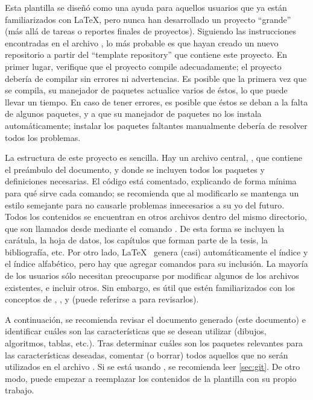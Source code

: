 Esta plantilla se dise\~n\'o como una ayuda para aquellos usuarios que ya
est\'an familiarizados con \LaTeX, pero nunca han desarrollado un proyecto
``grande'' (m\'as all\'a de tareas o reportes finales de proyectos).   Siguiendo
las instrucciones encontradas en el archivo , lo m\'as probable
es que hayan creado un nuevo repositorio a partir del ``template repository''
que contiene este proyecto.   En primer lugar, verifique que el proyecto compile
adecuadamente; el proyecto deber\'ia de compilar sin errores ni advertencias. Es
posible que la primera vez que se compila, su manejador de paquetes actualice
varios de \'estos, lo que puede llevar un tiempo.   En caso de tener errores, es
posible que \'estos se deban a la falta de algunos paquetes, y a que su
manejador de paquetes no los instala autom\'aticamente;  instalar los paquetes
faltantes manualmente deber\'ia de resolver todos los problemas.

La estructura de este proyecto es sencilla.   Hay un archivo central,
, que contiene el pre\'ambulo del documento, y donde se incluyen
todos los paquetes y definiciones necesarias.   El c\'odigo est\'a comentado,
explicando de forma m\'inima para qu\'e sirve cada comando; se recomienda que al
modificarlo se mantenga un estilo semejante para no causarle problemas
innecesarios a su yo del futuro.   Todos los contenidos se encuentran en otros
archivos dentro del mismo directorio, que son llamados desde 
mediante el comando .   De esta forma se
incluyen la car\'atula, la hoja de datos, los cap\'itulos que forman parte de la
tesis, la bibliograf\'ia, etc.   Por otro lado, \LaTeX~ genera (casi)
autom\'aticamente el \'indice y el \'indice alfab\'etico, pero hay que agregar
comandos para su inclusi\'on.  La mayor\'ia de los usuarios s\'olo necesitan
preocuparse por modificar algunos de los archivos existentes, e incluir otros.
Sin embargo, es \'util que est\'en familiarizados con los conceptos de
, ,  y  (puede
referirse a \cite{oetiker2007} para revisarlos).

A continuaci\'on, se recomienda revisar el documento generado (este documento) e
identificar cu\'ales son las caracter\'isticas que se desean utilizar (dibujos,
algoritmos, tablas, etc.).   Tras determinar cu\'ales son los paquetes
relevantes para las caracter\'isticas deseadas, comentar (o borrar) todos
aquellos que no ser\'an utilizados en el archivo .   Si se est\'a
usando , se recomienda leer \cref{sec:git}.   De otro modo, puede
empezar a reemplazar los contenidos de la plantilla con su propio trabajo.

